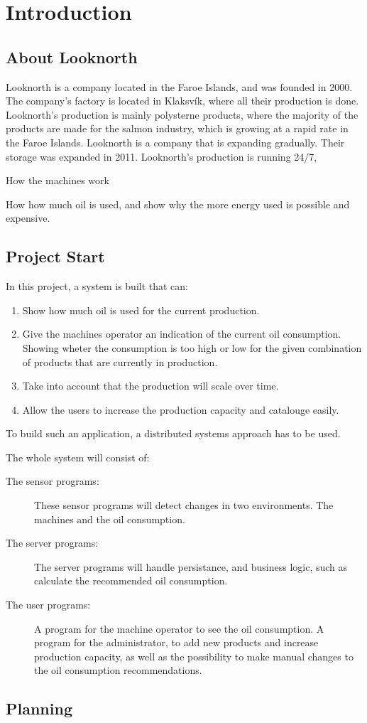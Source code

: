 \chapter{Introduction} \label{chap:intro}
\section{About Looknorth}
Looknorth is a company located in the Faroe Islands, and was founded in 2000. The company's factory is located in Klaksvík, where all their production is done. Looknorth's production is mainly polysterne products, where the majority of the products are made for the salmon industry, which is growing at a rapid rate in the Faroe Islands.
Looknorth is a company that is expanding gradually. Their storage was expanded in 2011.
Looknorth's production is running 24/7,

How the machines work

How how much oil is used, and show why the more energy used is possible and expensive.

\section{Project Start}
In this project, a system is built that can:
\begin{enumerate}
	\item Show how much oil is used for the current production.
	
	\item Give the machines operator an indication of the current oil consumption. Showing wheter the consumption is too high or low for the given combination of products that are currently in production.
	
	\item Take into account that the production will scale over time.
	
	\item Allow the users to increase the production capacity and catalouge easily.
\end{enumerate}

To build such an application, a distributed systems approach has to be used.

The whole system will consist of: 

\begin{description}
	\item[The sensor programs:] These sensor programs will detect changes in two environments. The machines and the oil consumption.
	\item[The server programs:] The server programs will handle persistance, and business logic, such as calculate the recommended oil consumption.
	\item[The user programs:] A program for the machine operator to see the oil consumption. 
	A program for the administrator, to add new products and increase production capacity, as well as the possibility to make manual changes to the oil consumption recommendations. 
\end{description} 

\section{Planning} 